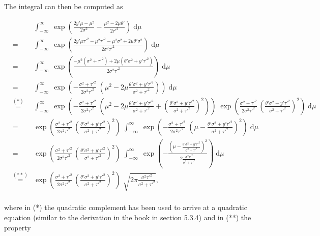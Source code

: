 \documentclass[fontsize=11pt,DIV=18,parskip=half]{scrartcl}
\begin{document}
\begin{enumerate}
The integral can then be computed as

\begin{eqnarray*}
& & \int_{-\infty}^\infty  \; \exp\left(\frac{2y'\mu - \mu^2}{2\sigma^2}-\frac{\mu^2-2\mu\theta'}{2\tau'^2}\right) \; \text{d}\mu\\
&=& \int_{-\infty}^\infty  \; \exp\left(\frac{2y'\mu\tau'^2 - \mu^2\tau'^2-\mu^2\sigma^2+2\mu\theta'\sigma^2}{2\sigma^2\tau'^2}\right) \; \text{d}\mu\\
&=& \int_{-\infty}^\infty  \; \exp\left(\frac{-\mu^2\left(\sigma^2 + \tau'^2\right) + 2 \mu \left( \theta'\sigma^2 + y'\tau'^2\right) }{2\sigma^2\tau'^2}\right) \; \text{d}\mu\\
&=& \int_{-\infty}^\infty  \; \exp\left( -\frac{\sigma^2 + \tau'^2}{2\sigma^2\tau'^2} \; \left( \mu^2 - 2 \mu \frac{\theta'\sigma^2 + y'\tau'^2}{\sigma^2+\tau'^2}\right) \right) \; \text{d}\mu\\
&\stackrel{(*)}{=}& \int_{-\infty}^\infty  \; \exp\left( -\frac{\sigma^2 + \tau'^2}{2\sigma^2\tau'^2} \; \left( \mu^2 - 2\mu \frac{\theta'\sigma^2 + y'\tau'^2}{\sigma^2+\tau'^2} + \left(\frac{\theta'\sigma^2 + y'\tau'^2}{\sigma^2+\tau'^2}\right)^2\right) \right) \; \exp\left(\frac{\sigma^2 + \tau'^2}{2\sigma^2\tau'^2} \, \left(\frac{\theta'\sigma^2 + y'\tau'^2}{\sigma^2+\tau'^2}\right)^2\right)\; \text{d}\mu\\
&=& \exp\left(\frac{\sigma^2 + \tau'^2}{2\sigma^2\tau'^2} \, \left(\frac{\theta'\sigma^2 + y'\tau'^2}{\sigma^2+\tau'^2}\right)^2\right) \; \int_{-\infty}^\infty  \; \exp\left( -\frac{\sigma^2 + \tau'^2}{2\sigma^2\tau'^2} \; \left( \mu - \frac{\theta'\sigma^2 + y'\tau'^2}{\sigma^2+\tau'^2}\right)^2 \right) \; \text{d}\mu\\ 
&=& \exp\left(\frac{\sigma^2 + \tau'^2}{2\sigma^2\tau'^2} \, \left(\frac{\theta'\sigma^2 + y'\tau'^2}{\sigma^2+\tau'^2}\right)^2\right) \; \int_{-\infty}^\infty  \; \exp\left( -\frac{\left( \mu - \frac{\theta'\sigma^2 + y'\tau'^2}{\sigma^2+\tau'^2}\right)^2}{2 \frac{\sigma^2\tau'^2}{\sigma^2+\tau'^2}} \right) \; \text{d}\mu\\ 
&\stackrel{(**)}{=}& \exp\left(\frac{\sigma^2 + \tau'^2}{2\sigma^2\tau'^2} \, \left(\frac{\theta'\sigma^2 + y'\tau'^2}{\sigma^2+\tau'^2}\right)^2\right) \; \sqrt{2\pi \frac{\sigma^2\tau'^2}{\sigma^2+\tau'^2}},\\ 
\end{eqnarray*}

where in (*) the quadratic complement has been used to arrive at a quadratic equation (similar to the derivation in the book in section 5.3.4) and in (**) the property


\end{enumerate}
\end{document}
